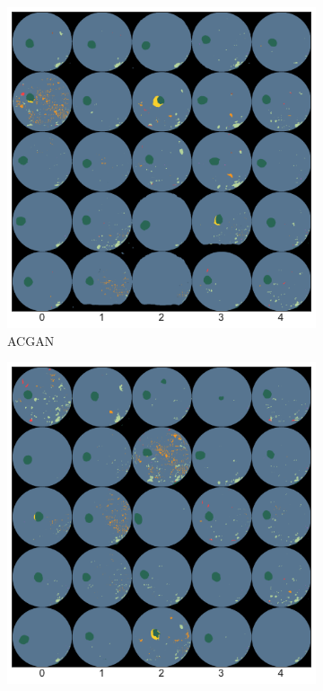 \begin{figure}[h]
    \centering
    \begin{subfigure}{0.31\textwidth}
        \centering
        \includegraphics[width=\linewidth]{labels/figs/acgan_sample.pdf}
        \caption{ACGAN}
        \label{fig:acgan_sample}
    \end{subfigure}
    \begin{subfigure}{0.31\textwidth}
        \centering
        \includegraphics[width=\linewidth]{labels/figs/acgan_mask_sample.pdf}

\end{subfigure}
\end{figure}

